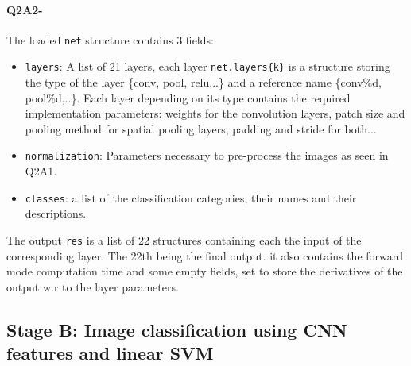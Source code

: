 \documentclass[11pt]{article}
\newcommand{\1}{\mathbbm{1}}
\newcommand{\0}{\mathbf{0}}
\begin{document}
	\paragraph{Q2A2-}
		The loaded \texttt{net} structure contains 3 fields:
		\begin{itemize}
		\item\texttt{layers}: A list of 21 layers, each layer \texttt{net.layers\{k\}} is a structure storing the type of the layer \{conv, pool, relu,..\} and a reference name \{conv\%d, pool\%d,..\}. Each layer depending on its type contains the required implementation parameters: weights for the convolution layers, patch size and pooling method for spatial pooling layers, padding and stride for both...
		\item\texttt{normalization}: Parameters necessary to pre-process the images as seen in Q2A1.
		\item\texttt{classes}: a list of the classification categories, their names and their descriptions.
		\end{itemize}
		The output \texttt{res} is a list of 22 structures containing each the input of the corresponding layer. The 22th being the final output. it also contains the forward mode computation time and some empty fields, set to store the derivatives of the output w.r to the layer parameters.
\subsection*{Stage B: Image classification using CNN features and linear SVM}
\end{document}
